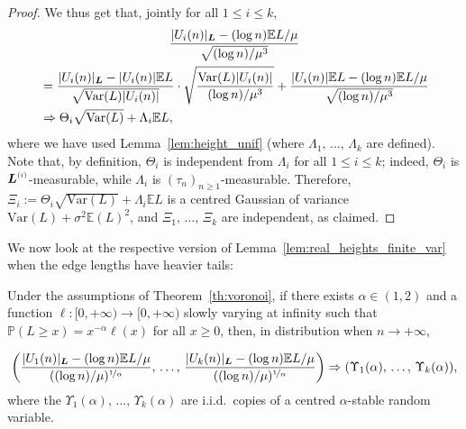 \documentclass[AHL,Unicode,longabstracts,published]{cedram}
\newcommand{\bs}{\ensuremath{\boldsymbol}}
\newcommand{\sss}{\ensuremath{\scriptscriptstyle}}
\newcommand{\bbP}{\mathbb{P}}
\newcommand{\bbE}{\mathbb{E}}
\newcommand{\Var}{\mathrm{Var}}
\begin{document}
\begin{proof}
We thus get that, jointly for all $1\leq i\leq k$,
\begin{multline*}
\frac{|U_i(n)|_{\bs L}-(\log n)\bbE L/\mu}{\sqrt{(\log n)/\mu^3}}\\
\begin{aligned}
&= \frac{|U_i(n)|_{\bs L}-|U_i(n)|\bbE L}{\sqrt{\Var(L)|U_i(n)|}}
\cdot \sqrt{\frac{\Var(L)|U_i(n)|}{(\log n)/\mu^3}} + \frac{|U_i(n)|\bbE L-(\log n)\bbE L/\mu}{\sqrt{(\log n)/\mu^3}}\\
&\Rightarrow \Theta_i\sqrt{\Var(L)}+\Lambda_i\bbE L,
\end{aligned}
\end{multline*}
where we have used Lemma~\ref{lem:height_unif} (where $\Lambda_1, \,\ldots,\,\Lambda_k$ are defined). Note that, by definition, $\Theta_i$ is independent from $\Lambda_i$ for all $1\leq i\leq k$; indeed, $\Theta_i$ is $\bs L^{\sss (i)}$-measurable, while $\Lambda_i$ is $(\tau_n)_{n\geq 1}$-measurable. Therefore, $\Xi_i:=\Theta_i\sqrt{\Var(L)}+\Lambda_i\bbE L$ is a centred Gaussian of variance $\Var(L) + \sigma^2\bbE(L)^2$, and $\Xi_1,\,\ldots,\, \Xi_k$ are independent, as claimed.
\end{proof}


We now look at the respective version of Lemma~\ref{lem:real_heights_finite_var} when the edge lengths have heavier tails:

\begin{lemm}\label{lem:real_height_heavy_tails}
Under the assumptions of Theorem~\ref{th:voronoi}, if there exists $\alpha\in (1,2)$ and a function $\ell\colon[0,+\infty)\to[0,+\infty)$ slowly varying at infinity such that $\bbP(L\geq x)=x^{-\alpha}\ell(x)$ for all $x\geq 0$, then, in distribution when $n\to+\infty$,

\[
\left(\frac{|U_1(n)|_{\bs L} - (\log n)\bbE L/\mu}{((\log n)/\mu)^{\nicefrac1\alpha}},\,\ldots,
\,\frac{|U_k(n)|_{\bs L} - (\log n)\bbE L/\mu}{((\log n)/\mu)^{\nicefrac1\alpha}}
\right)\Rightarrow (\Upsilon_1(\alpha),\,\ldots,\, \Upsilon_k(\alpha)),
\]
where the $\Upsilon_1(\alpha),\,\ldots,\, \Upsilon_k(\alpha)$ are i.i.d.\ copies of a centred $\alpha$-stable random variable.
\end{lemm}
\end{document}
